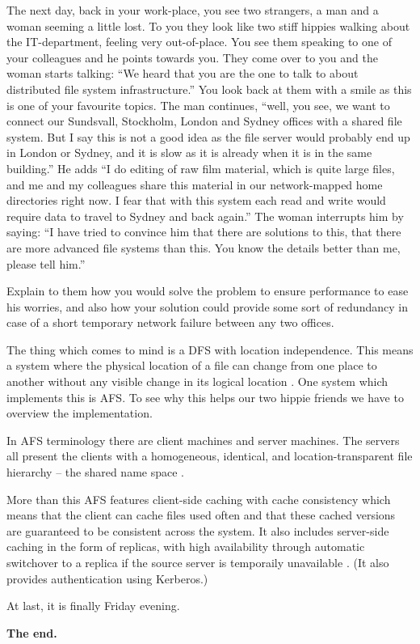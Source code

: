 \documentclass[addpoints]{miunexam}
\begin{document}
\begin{questions}
  \question[6]\label{q:dfs}
  The next day, back in your work-place, you see two strangers, a man and 
  a woman seeming a little lost.
  To you they look like two stiff hippies walking about the IT-department, 
  feeling very out-of-place.
  You see them speaking to one of your colleagues and he points towards you.
  They come over to you and the woman starts talking:  ``We heard that you are 
  the one to talk to about distributed file system infrastructure.''
  You look back at them with a smile as this is one of your favourite topics.
  The man continues, ``well, you see, we want to connect our Sundsvall, 
  Stockholm, London and Sydney offices with a shared file system.  But I say 
  this is not a good idea as the file server would probably end up in London or 
  Sydney, and it is slow as it is already when it is in the same building.''
  He adds ``I do editing of raw film material, which is quite large files, and 
  me and my colleagues share this material in our network-mapped home 
  directories right now.  I fear that with this system each read and write 
  would require data to travel to Sydney and back again.''
  The woman interrupts him by saying: ``I have tried to convince him that there 
  are solutions to this, that there are more advanced file systems than this.  
  You know the details better than me, please tell him.''

  Explain to them how you would solve the problem to ensure performance to ease 
  his worries, and also how your solution could provide some sort of redundancy 
  in case of a short temporary network failure between any two offices.

  \begin{solution}
    The thing which comes to mind is a DFS with location independence.
    This means a system where the physical location of a file can change from 
    one place to another without any visible change in its logical location 
    \cite[p. 707]{Silberschatz2009osc}.
    One system which implements this is AFS.
    To see why this helps our two hippie friends we have to overview the 
    implementation.

    In AFS terminology there are client machines and server machines.
    The servers all present the clients with a homogeneous, identical, and 
    location-transparent file hierarchy -- the shared name space \cite[p.  
    719]{Silberschatz2009osc}.

    More than this AFS features client-side caching with cache consistency 
    \cite[p. 718]{Silberschats2009osc} which means that the client can cache 
    files used often and that these cached versions are guaranteed to be 
    consistent across the system.
    It also includes server-side caching in the form of replicas, with high 
    availability through automatic switchover to a replica if the source server 
    is temporaily unavailable \cite[p. 718]{Silberschatz2009osc}.
    (It also provides authentication using Kerberos.)
  \end{solution}
\end{questions}

At last, it is finally Friday evening.
\begin{center}
  \textbf{The end.}
\end{center}


\end{document}
